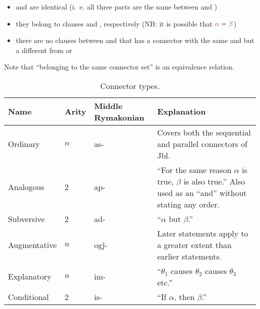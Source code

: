\documentclass{book}
\newcommand{\lname}{Middle Rymakonian}
\begin{document}
\begin{itemize}
  \item {} and  are identical (i.~e. all three parts are the same between  and )
  \item they belong to clauses \hlv{$\alpha$} and \hlvi{$\beta$}, respectively (NB: it is possible that $\hlv{\alpha} = \hlvi{\beta}$)
  \item there are no clauses between \hlv{$\alpha$} and \hlvi{$\beta$} that has a connector with the same  and  but a different  from  or 
\end{itemize}

Note that ``belonging to the same connector set'' is an equivalence relation.

\begin{table}[ht]
  \caption{Connector types. \label{table:contypes}}
  \centering
  \begin{tabu} to 
    Name & Arity & \textnormal{\lname} & Explanation \\
    \hline
    Ordinary & $n$ & as- & Covers both the sequential and parallel connectors of Jbl. \\
    Analogous & 2 & ap- & ``For the same reason $\alpha$ is true, $\beta$ is also true.'' Also used as an ``and'' without stating any order. \\
    Subversive & 2 & ad- & ``$\alpha$ but $\beta$.'' \\
    Augmentative & $n$ & og\^j- & Later statements apply to a greater extent than earlier statements. \\
    Explanatory & $n$ & im- & ``$\theta_1$ causes $\theta_2$ causes $\theta_3$ etc.'' \\
    Conditional & 2 & is- & ``If $\alpha$, then $\beta$.'' \\
  \end{tabu}
\end{table}
\end{document}
